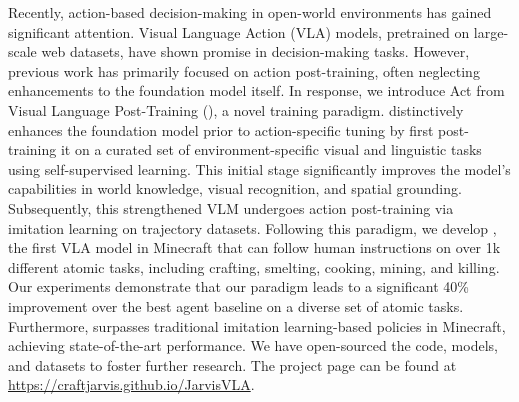 Recently, action-based decision-making in open-world environments has gained significant attention. Visual Language Action (VLA) models, pretrained on large-scale web datasets, have shown promise in decision-making tasks. However, previous work has primarily focused on action post-training, often neglecting enhancements to the foundation model itself. 
In response, we introduce Act from Visual Language Post-Training (\method), a novel training paradigm. \method distinctively enhances the foundation model prior to action-specific tuning by first post-training it on a curated set of environment-specific visual and linguistic tasks using self-supervised learning. This initial stage significantly improves the model's capabilities in world knowledge, visual recognition, and spatial grounding. 
Subsequently, this strengthened VLM undergoes action post-training via imitation learning on trajectory datasets.
Following this paradigm, we develop \model, the first VLA model in Minecraft that can follow human instructions on over 1k different atomic tasks, including crafting, smelting, cooking, mining, and killing. 
Our experiments demonstrate that our \method paradigm leads to a significant 40\% improvement over the best agent baseline on a diverse set of atomic tasks. Furthermore, \model surpasses traditional imitation learning-based policies in Minecraft, achieving state-of-the-art performance. We have open-sourced the code, models, and datasets to foster further research.
The project page can be found at \url{https://craftjarvis.github.io/JarvisVLA}.